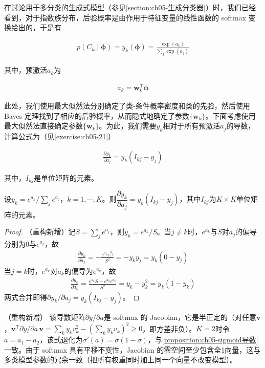 \documentclass[../../main.tex]{subfiles}
\begin{document}
在讨论用于多分类的生成式模型（参见\cref{section:ch05-生成分类器}）时，我们已经看到，对于指数族分布，后验概率是由作用于特征变量的线性函数的 softmax 变换给出的，于是有

\begin{align}
  p(C_k\mid\boldsymbol{\phi})=y_k(\boldsymbol{\phi})=\frac{\exp(a_k)}{\sum_j\exp(a_j)}
  \label{align:ch05-多类后验}
\end{align}

其中，预激活$a_k$为

\begin{align}
  a_k=\boldsymbol{w}_k^{\mathsf{T}}\boldsymbol{\phi}
  \label{align:ch05-多类线性预激活}
\end{align}

此处，我们使用最大似然法分别确定了类-条件概率密度和类的先验，然后使用 Bayes 定理找到了相应的后验概率，从而隐式地确定了参数$\{\boldsymbol{w}_k\}$。下面考虑使用最大似然法直接确定参数$\{\boldsymbol{w}_k\}$。为此，我们需要$y_k$相对于所有预激活$a_j$的导数，计算公式为（见\cref{exercise:ch05-21}）

\begin{align}
  \frac{\partial y_k}{\partial a_j}=y_k\left(I_{kj}-y_j\right)
  \label{align:ch05-softmax导数式}
\end{align}

其中，$I_{kj}$是单位矩阵的元素。

\begin{proposition}\label{proposition:ch05-softmax导数}
设$y_k=e^{a_k}/\sum_j e^{a_j}$，$k=1,\cdots,K$。则$\dfrac{\partial y_k}{\partial a_j}=y_k(I_{kj}-y_j)$，其中$I_{kj}$为$K\times K$单位矩阵的元素。
\end{proposition}

\begin{proof}
（重构新增）记$S=\sum_j e^{a_j}$，则$y_k=e^{a_k}/S$。当$j\neq k$时，$e^{a_k}$与$S$对$a_j$的偏导分别为0与$e^{a_j}$，故
\begin{align}
  \frac{\partial y_k}{\partial a_j}=-\frac{e^{a_k}e^{a_j}}{S^{2}}=-y_ky_j=y_k(0-y_j)
\end{align}
当$j=k$时，$e^{a_k}$对$a_k$的偏导为$e^{a_k}$，故
\begin{align}
  \frac{\partial y_k}{\partial a_k}=\frac{e^{a_k}S-e^{a_k}e^{a_k}}{S^{2}}=y_k-y_k^{2}=y_k(1-y_k)
\end{align}
两式合并即得$\partial y_k/\partial a_j=y_k(I_{kj}-y_j)$。
\end{proof}

\begin{remark}（重构新增）
该导数矩阵$\partial y/\partial a$是 softmax 的 Jacobian，它是半正定的（对任意$\boldsymbol{v}$，$\boldsymbol{v}^{\mathsf{T}}\partial y/\partial a\,\boldsymbol{v}=\sum_k y_k v_k^{2}-(\sum_k y_kv_k)^{2}\geqslant0$，即方差非负）。$K=2$时令$a=a_1-a_2$，该式退化为$\sigma'(a)=\sigma(1-\sigma)$，与\cref{proposition:ch05-sigmoid导数}一致。由于 softmax 具有平移不变性，Jacobian 的零空间至少包含全1向量，这与多类模型参数的冗余一致（把所有权重同时加上同一个向量不改变模型）。
\end{remark}
\end{document}

